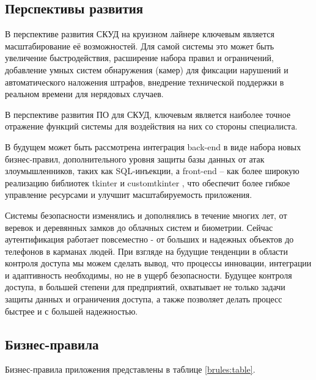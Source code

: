 \subsection{Перспективы развития}
В перспективе развития СКУД на круизном лайнере ключевым является масштабирование её возможностей. Для самой системы это может быть увеличение быстродействия, расширение набора правил и ограничений, добавление умных систем обнаружения (камер) для фиксации нарушений и автоматического наложения штрафов, внедрение технической поддержки в реальном времени для нерядовых случаев.

В перспективе развития ПО для СКУД, ключевым является наиболее точное отражение функций системы для воздействия на них со стороны специалиста.

В будущем может быть рассмотрена интеграция back-end в виде набора новых бизнес-правил, дополнительного уровня защиты базы данных от атак злоумышленников, таких как SQL-инъекции, а front-end – как более широкую реализацию библиотек \textquotedbl tkinter \textquotedbl и \textquotedbl customtkinter \textquotedbl, что обеспечит более гибкое управление ресурсами и улучшит масштабируемость приложения.

Системы безопасности изменялись и дополнялись в течение многих лет, от веревок и деревянных замков до облачных систем и биометрии. Сейчас аутентификация работает повсеместно - от больших и надежных объектов до телефонов в карманах людей. При взгляде на будущие тенденции в области контроля доступа мы можем сделать вывод, что процессы инновации, интеграции и адаптивность необходимы, но не в ущерб безопасности. Будущее контроля доступа, в большей степени для предприятий, охватывает не только задачи защиты данных и ограничения доступа, а также позволяет делать процесс быстрее и с большей надежностью.   


\subsection{Бизнес-правила}

Бизнес-правила приложения представлены в таблице  \ref{brules:table}.

